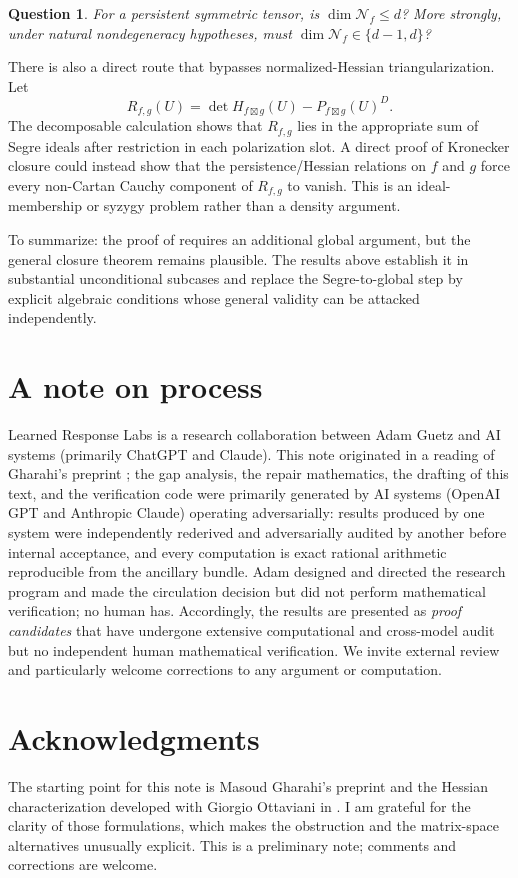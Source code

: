 \documentclass[11pt]{amsart}
\newtheorem{question}[theorem]{Question}
\newcommand{\boxt}{\mathbin{\boxtimes}}
\newcommand{\Nsp}{\mathcal N}
\begin{document}
\begin{question}\label{q:dimN}
For a persistent symmetric tensor, is $\dim\Nsp_f\le d$?  More strongly, under
natural nondegeneracy hypotheses, must $\dim\Nsp_f\in\{d-1,d\}$?
\end{question}

There is also a direct route that bypasses normalized-Hessian triangularization.
Let
\[
 R_{f,g}(U)=\det H_{f\boxt g}(U)-P_{f\boxt g}(U)^D.
\]
The decomposable calculation shows that $R_{f,g}$ lies in the appropriate sum
of Segre ideals after restriction in each polarization slot.  A direct proof of
Kronecker closure could instead show that the persistence/Hessian relations on
$f$ and $g$ force every non-Cartan Cauchy component of $R_{f,g}$ to vanish.
This is an ideal-membership or syzygy problem rather than a density argument.

To summarize: the proof of \cite[Proposition~10]{G26} requires an additional
global argument, but the general closure theorem remains plausible.  The
results above establish it in substantial unconditional subcases and replace
the Segre-to-global step by explicit algebraic conditions whose general validity
can be attacked independently.

\section*{A note on process}
Learned Response Labs is a research collaboration between Adam Guetz and AI
systems (primarily ChatGPT and Claude).  This note originated in a reading of
Gharahi's preprint \cite{G26}; the gap analysis, the repair mathematics, the
drafting of this text, and the verification code were primarily generated by
AI systems (OpenAI GPT and Anthropic Claude) operating adversarially: results
produced by one system were independently rederived and adversarially audited by
another before internal acceptance, and every computation is exact rational
arithmetic reproducible from the ancillary bundle.  Adam designed and directed
the research program and made the circulation decision but did not perform
mathematical verification; no human has.  Accordingly, the results are
presented as \emph{proof candidates} that have undergone extensive
computational and cross-model audit but no independent human mathematical
verification.  We invite external review and particularly welcome corrections
to any argument or computation.

\section*{Acknowledgments}
The starting point for this note is Masoud Gharahi's preprint \cite{G26} and the
Hessian characterization developed with Giorgio Ottaviani in \cite{GO25}.  I am
grateful for the clarity of those formulations, which makes the obstruction and
the matrix-space alternatives unusually explicit.  This is a preliminary note;
comments and corrections are welcome.
\end{document}
